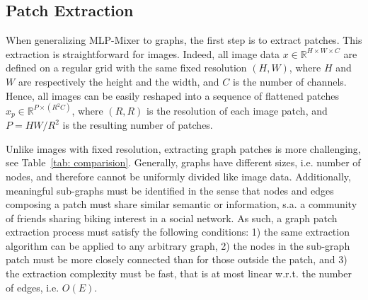 \documentclass{article}
\begin{document}
\subsection{Patch Extraction}
\label{sec:metis}



When generalizing MLP-Mixer to graphs, the first step is to extract patches. This extraction is straightforward for images. Indeed, all image data $x \in \mathbb{R}^{H\times W \times C}$ are defined on a regular grid with the same fixed resolution $(H,W)$, where $H$ and $W$ are respectively the height and the width, and $C$ is the number of channels. Hence, all images can be easily reshaped into a sequence of flattened patches $x_p\in \mathbb{R}^{P\times (R^2C)}$, where $(R,R)$ is the resolution of each image patch, and $P = HW/R^2$ is the resulting number of patches.


Unlike images with fixed resolution, extracting graph patches is more challenging, see Table~\ref{tab: comparision}. Generally, graphs have different sizes, i.e. number of nodes, and therefore cannot be uniformly divided like image data. Additionally, meaningful sub-graphs must be identified in the sense that nodes and edges composing a patch must share similar semantic or information, s.a. a community of friends sharing biking interest in a social network. As such, a graph patch extraction process must satisfy the following conditions: 1) the same extraction algorithm can be applied to any arbitrary graph, 2) the nodes in the sub-graph patch must be more closely connected than for those outside the patch, and 3) the extraction complexity must be fast, that is at most linear w.r.t. the number of edges, i.e. $O(E)$.
\end{document}
